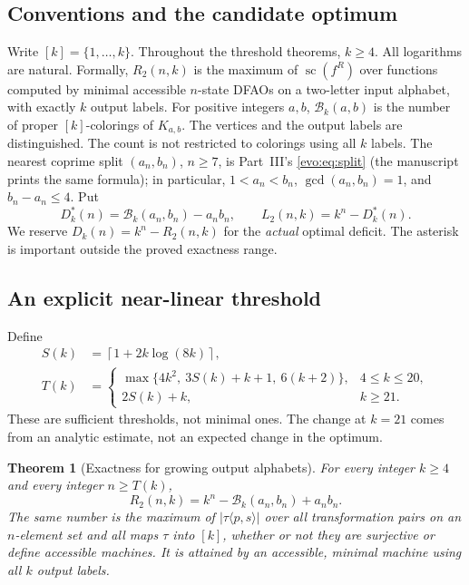 \documentclass[11pt,a4paper]{article}
\numberwithin{equation}{section}
\newtheorem{theorem}{Theorem}[section]
\theoremstyle{definition}
\theoremstyle{remark}
\newcommand{\statecomplex}{\operatorname{sc}}
\newcommand{\Bip}{\mathcal B}
\newcommand{\nlceil}[1]{\left\lceil #1\right\rceil}
\begin{document}
\subsection{Conventions and the candidate optimum}
Write $[k]=\{1,\ldots,k\}$. Throughout the threshold theorems, $k\ge4$.
All logarithms are natural. Formally, $R_2(n,k)$ is the maximum of
$\statecomplex(f^R)$ over functions computed by minimal accessible $n$-state
DFAOs on a two-letter input alphabet, with exactly $k$ output labels.
For positive integers $a,b$, $\Bip_k(a,b)$ is the number of proper
$[k]$-colorings of $K_{a,b}$. The vertices and the output labels are
distinguished. The count is not restricted to colorings using all $k$
labels. The nearest coprime split $(a_n,b_n)$, $n\ge7$, is Part~III's
\eqref{evo:eq:split} (the manuscript prints the same formula); in
particular, $1<a_n<b_n$, $\gcd(a_n,b_n)=1$, and $b_n-a_n\le4$.
Put
\begin{equation}\label{nl:eq:candidate}
 D^*_k(n)=\Bip_k(a_n,b_n)-a_nb_n,
 \qquad L_2(n,k)=k^n-D^*_k(n).
\end{equation}
We reserve $D_k(n)=k^n-R_2(n,k)$ for the \emph{actual} optimal deficit.
The asterisk is important outside the proved exactness range.

\subsection{An explicit near-linear threshold}
Define
\begin{align}
 S(k)&=\nlceil{1+2k\log(8k)},\label{nl:eq:S}\\
 T(k)&=\begin{cases}
 \max\{4k^2,\ 3S(k)+k+1,\ 6(k+2)\},&4\le k\le20,\\
 2S(k)+k,&k\ge21.
 \end{cases}\label{nl:eq:T}
\end{align}
These are sufficient thresholds, not minimal ones. The change at $k=21$
comes from an analytic estimate, not an expected change in the optimum.

\begin{theorem}[Exactness for growing output alphabets]\label{nl:thm:main}
For every integer $k\ge4$ and every integer $n\ge T(k)$,
\begin{equation}\label{nl:eq:main}
 \boxed{R_2(n,k)=k^n-\Bip_k(a_n,b_n)+a_nb_n.}
\end{equation}
The same number is the maximum of $|\tau\langle p,s\rangle|$ over
\emph{all} transformation pairs on an $n$-element set and all maps
$\tau$ into $[k]$, whether or not they are surjective or define accessible
machines. It is attained by an accessible, minimal machine using all $k$
output labels.
\end{theorem}
\end{document}

